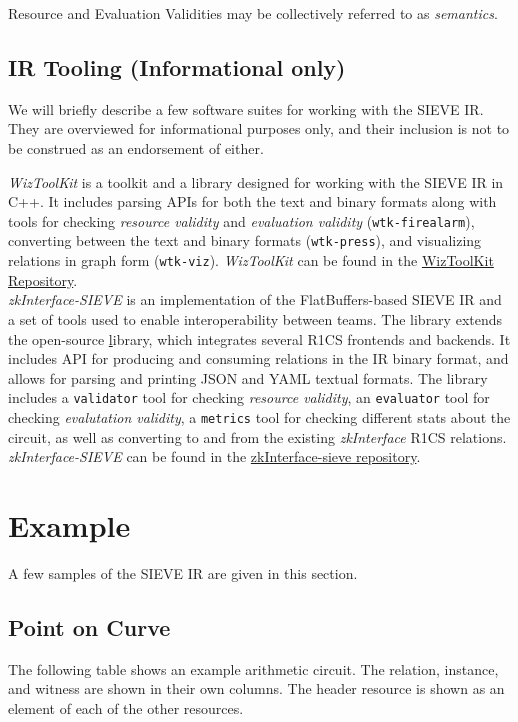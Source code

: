 \documentclass[12pt]{article}
\begin{document}
Resource and Evaluation Validities may be collectively referred to as \textit{semantics}.

\subsection{IR Tooling (Informational only)}
We will briefly describe a few software suites for working with the SIEVE IR.
They are overviewed for informational purposes only, and their inclusion is not to be construed as an endorsement of either.

\textit{WizToolKit} is a toolkit and a library designed for working with the SIEVE IR in C++.
It includes parsing APIs for both the text and binary formats along with tools for checking \textit{resource validity} and \textit{evaluation validity} (\texttt{wtk-firealarm}), converting between the text and binary formats (\texttt{wtk-press}), and visualizing relations in graph form (\texttt{wtk-viz}).
\textit{WizToolKit} can be found in the \href{https://github.com/stealthsoftwareinc/wiztoolkit}{WizToolKit Repository}.\\

\textit{zkInterface-SIEVE} is an implementation of the FlatBuffers-based SIEVE IR and a set of tools used to enable interoperability between teams. The library extends the open-source \href{https://github.com/QED-it/zkinterface} library, which integrates several R1CS frontends and backends.
It includes API for producing and consuming relations in the IR binary format, and allows for parsing and printing JSON and YAML textual formats. The library includes a \texttt{validator} tool for checking \textit{resource validity}, an \texttt{evaluator} tool for checking \textit{evalutation validity}, a \texttt{metrics} tool for checking different stats about the circuit,  as well as converting to and from the existing \textit{zkInterface} R1CS relations.
\textit{zkInterface-SIEVE} can be found in the \href{https://github.com/QED-it/zkinterface-ir}{zkInterface-sieve repository}.\\

\newpage
\section{Example}\label{example}
A few samples of the SIEVE IR are given in this section.

\subsection{Point on Curve}\label{ex_ir0}
The following table shows an example arithmetic circuit.
The relation, instance, and witness are shown in their own columns.
The header resource is shown as an element of each of the other resources. \\
\end{document}

